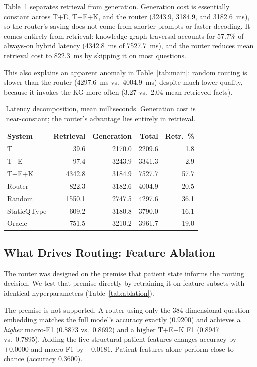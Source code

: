 \documentclass[preprint,12pt]{elsarticle}
\begin{document}
Table~\ref{tab:latency} separates retrieval from generation. Generation
cost is essentially constant across T+E, T+E+K, and the router
(3243.9, 3184.9, and 3182.6~ms), so the router's saving does not come
from shorter prompts or faster decoding. It comes entirely from
retrieval: knowledge-graph traversal accounts for 57.7\% of always-on
hybrid latency (4342.8~ms of 7527.7~ms), and the router reduces mean
retrieval cost to 822.3~ms by skipping it on most questions.

This also explains an apparent anomaly in Table~\ref{tab:main}: random
routing is slower than the router (4297.6~ms vs.\ 4004.9~ms) despite
much lower quality, because it invokes the KG more often (3.27 vs.\
2.04 mean retrieved facts).

\begin{table}[t]
\centering
\footnotesize
\setlength{\tabcolsep}{4pt}
\caption{Latency decomposition, mean milliseconds. Generation cost is near-constant; the router's advantage lies entirely in retrieval.}
\label{tab:latency}
\begin{tabular}{lrrrr}
\toprule
System & Retrieval & Generation & Total & Retr.~\% \\
\midrule
T           &   39.6 & 2170.0 & 2209.6 &  1.8 \\
T+E         &   97.4 & 3243.9 & 3341.3 &  2.9 \\
T+E+K       & 4342.8 & 3184.9 & 7527.7 & 57.7 \\
Router      &  822.3 & 3182.6 & 4004.9 & 20.5 \\
Random      & 1550.1 & 2747.5 & 4297.6 & 36.1 \\
StaticQType &  609.2 & 3180.8 & 3790.0 & 16.1 \\
Oracle      &  751.5 & 3210.2 & 3961.7 & 19.0 \\
\bottomrule
\end{tabular}
\end{table}

\subsection{What Drives Routing: Feature Ablation}
\label{sec:ablation}

The router was designed on the premise that patient state informs the
routing decision. We test that premise directly by retraining it on
feature subsets with identical hyperparameters
(Table~\ref{tab:ablation}).

The premise is not supported. A router using only the 384-dimensional
question embedding matches the full model's accuracy exactly (0.9200)
and achieves a \textit{higher} macro-F1 (0.8873 vs.\ 0.8692) and a
higher T+E+K F1 (0.8947 vs.\ 0.7895). Adding the five structural
patient features changes accuracy by $+0.0000$ and macro-F1 by
$-0.0181$. Patient features alone perform close to chance
(accuracy 0.3600).
\end{document}
